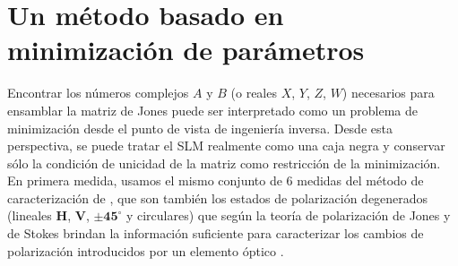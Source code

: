 
\section{Un método basado en minimización de parámetros}
Encontrar los números complejos $A$ y $B$ (o reales $X$, $Y$, $Z$,
$W$) necesarios para ensamblar la
matriz de Jones puede ser interpretado como un problema de
minimización desde el punto de vista de ingeniería inversa. Desde esta
perspectiva, se puede tratar el SLM realmente como una caja negra y
conservar sólo la condición de unicidad de la matriz
como restricción de la minimización.  
En primera medida, usamos el mismo conjunto de 6 medidas 
del método de caracterización 
de , que son también los estados de polarización
degenerados (lineales
$\mathbf{H}$, $\mathbf{V}$, $\mathbf{\pm 45^{\circ}}$ y circulares) que según la
teoría de polarización de Jones y de Stokes brindan la información suficiente para
caracterizar los cambios de polarización introducidos por un elemento
óptico .

